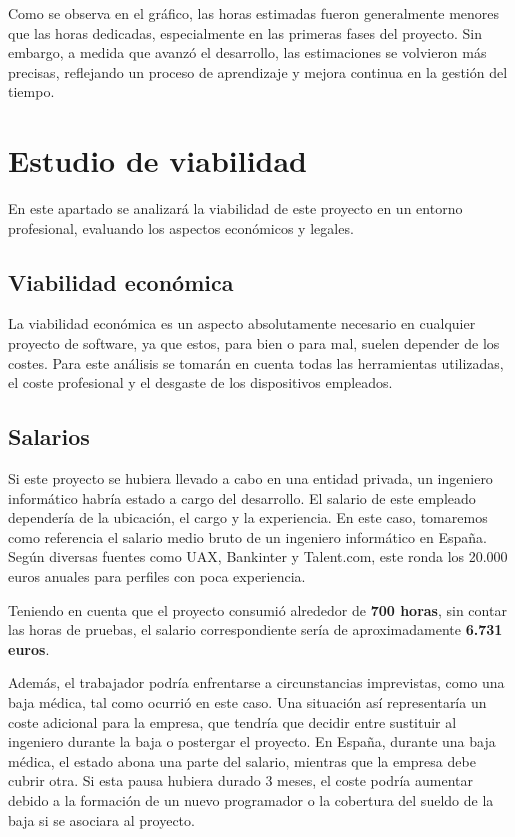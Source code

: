 Como se observa en el gráfico, las horas estimadas fueron generalmente menores que las horas dedicadas, especialmente en las primeras fases del proyecto. Sin embargo, a medida que avanzó el desarrollo, las estimaciones se volvieron más precisas, reflejando un proceso de aprendizaje y mejora continua en la gestión del tiempo.

\section{Estudio de viabilidad}

En este apartado se analizará la viabilidad de este proyecto en un entorno profesional, evaluando los aspectos económicos y legales.

\subsection{Viabilidad económica}

La viabilidad económica es un aspecto absolutamente necesario en cualquier proyecto de software, ya que estos, para bien o para mal, suelen depender de los costes. Para este análisis se tomarán en cuenta todas las herramientas utilizadas, el coste profesional y el desgaste de los dispositivos empleados.

\subsection{Salarios}

Si este proyecto se hubiera llevado a cabo en una entidad privada, un ingeniero informático habría estado a cargo del desarrollo. El salario de este empleado dependería de la ubicación, el cargo y la experiencia. En este caso, tomaremos como referencia el salario medio bruto de un ingeniero informático en España. Según diversas fuentes como UAX, Bankinter y Talent.com, este ronda los 20.000 euros anuales para perfiles con poca experiencia.

Teniendo en cuenta que el proyecto consumió alrededor de \textbf{700 horas}, sin contar las horas de pruebas, el salario correspondiente sería de aproximadamente \textbf{6.731 euros}. 

Además, el trabajador podría enfrentarse a circunstancias imprevistas, como una baja médica, tal como ocurrió en este caso. Una situación así representaría un coste adicional para la empresa, que tendría que decidir entre sustituir al ingeniero durante la baja o postergar el proyecto. En España, durante una baja médica, el estado abona una parte del salario, mientras que la empresa debe cubrir otra. Si esta pausa hubiera durado 3 meses, el coste podría aumentar debido a la formación de un nuevo programador o la cobertura del sueldo de la baja si se asociara al proyecto.

